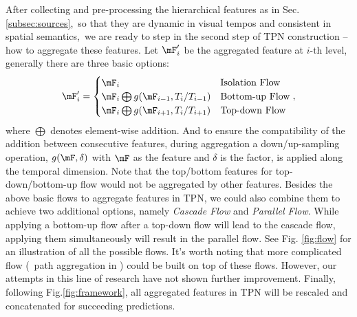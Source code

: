 \documentclass[10pt,twocolumn,letterpaper]{article}
\begin{document}
After collecting and pre-processing the hierarchical features as in Sec.\ref{subsec:sources},\
so that they are dynamic in visual tempos and consistent in spatial semantics,\
we are ready to step in the second step of TPN construction -- how to aggregate these features.
Let $\mF'_i$ be the aggregated feature at $i$-th level, generally there are three basic options:
\begin{align}
	\mF'_i = \begin{cases}
			\mF_i & \mathrm{Isolation~Flow} \\
			\mF_i \bigoplus g(\mF_{i-1}, T_i/T_{i-1}) & \mathrm{Bottom}$-$\mathrm{up~Flow} \\
			\mF_i \bigoplus g(\mF_{i+1}, T_i/T_{i+1}) & \mathrm{Top}$-$\mathrm{down~Flow}
		\end{cases},
\end{align} 
where $\bigoplus$ denotes element-wise addition.
And to ensure the compatibility of the addition between consecutive features,
during aggregation a down/up-sampling operation, $g(\mF, \delta)$ with $\mF$ as the feature and $\delta$ is the factor, is applied along the temporal dimension.
Note that the top/bottom features for top-down/bottom-up flow would not be aggregated by other features.
Besides the above basic flows to aggregate features in TPN, we could also combine them to achieve two additional options, namely \emph{Cascade Flow} and \emph{Parallel Flow}.
While applying a bottom-up flow after a top-down flow will lead to the cascade flow, applying them simultaneously will result in the parallel flow.
See Fig. \ref{fig:flow} for an illustration of all the possible flows. 
It's worth noting that more complicated flow (\eg~path aggregation in \cite{panet}) could be built on top of these flows.
However, our attempts in this line of research have not shown further improvement.
Finally, following Fig.\ref{fig:framework}, all aggregated features in TPN will be rescaled and concatenated for succeeding predictions.
\end{document}
